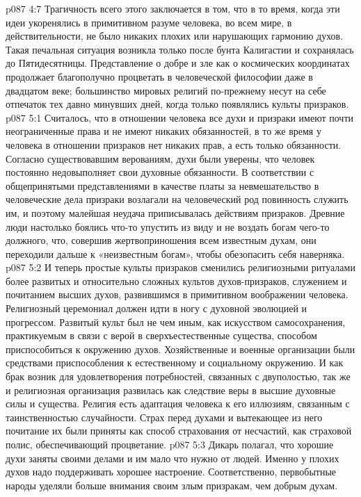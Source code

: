 \vs p087 4:7 Трагичность всего этого заключается в том, что в то время, когда эти идеи укоренялись в примитивном разуме человека, во всем мире, в действительности, не было никаких плохих или нарушающих гармонию духов. Такая печальная ситуация возникла только после бунта Калигастии и сохранялась до Пятидесятницы. Представление о добре и зле как о космических координатах продолжает благополучно процветать в человеческой философии даже в двадцатом веке; большинство мировых религий по\hyp{}прежнему несут на себе отпечаток тех давно минувших дней, когда только появлялись культы призраков.
\vs p087 5:1 Считалось, что в отношении человека все духи и призраки имеют почти неограниченные права и не имеют никаких обязанностей, в то же время у человека в отношении призраков нет никаких прав, а есть только обязанности. Согласно существовавшим верованиям, духи были уверены, что человек постоянно недовыполняет свои духовные обязанности. В соответствии с общепринятыми представлениями в качестве платы за невмешательство в человеческие дела призраки возлагали на человеческий род повинность служить им, и поэтому малейшая неудача приписывалась действиям призраков. Древние люди настолько боялись что\hyp{}то упустить из виду и не воздать богам чего\hyp{}то должного, что, совершив жертвоприношения всем известным духам, они переходили дальше к «неизвестным богам», чтобы обезопасить себя наверняка.
\vs p087 5:2 И теперь простые культы призраков сменились религиозными ритуалами более развитых и относительно сложных культов духов\hyp{}призраков, служением и почитанием высших духов, развившимся в примитивном воображении человека. Религиозный церемониал должен идти в ногу с духовной эволюцией и прогрессом. Развитый культ был не чем иным, как искусством самосохранения, практикуемым в связи с верой в сверхъестественные существа, способом приспособиться к окружению духов. Хозяйственные и военные организации были средствами приспособления к естественному и социальному окружению. И как брак возник для удовлетворения потребностей, связанных с двуполостью, так же и религиозная организация развилась как следствие веры в высшие духовные силы и существа. Религия есть адаптация человека к его иллюзиям, связанным с таинственностью случайности. Страх перед духами и вытекающее из него почитание их были приняты как способ страхования от несчастий, как страховой полис, обеспечивающий процветание.
\vs p087 5:3 Дикарь полагал, что хорошие духи заняты своими делами и им мало что нужно от людей. Именно у плохих духов надо поддерживать хорошее настроение. Соответственно, первобытные народы уделяли больше внимания своим злым призракам, чем добрым духам.

